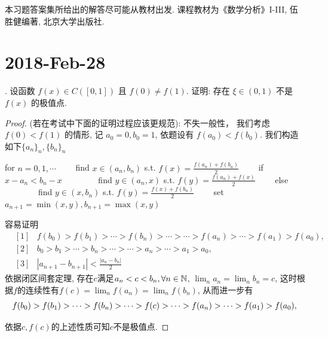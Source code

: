 \documentclass[a4paper,12pt]{article}
\author{龙子超}
\title{{\heiti {\zihao{3} 数学分析II-习题课}}}
\date{}
\begin{document}
\maketitle
%


本习题答案集所给出的解答尽可能从教材出发. 课程教材为《数学分析》I-III, 伍胜健编著,
北京大学出版社.
\section*{2018-Feb-28}
. 设函数 $f(x)\in C([0,1])$ 且 $f(0)\neq f(1)$. 
证明: 存在 $\xi\in(0,1)$ 不是 $f(x)$ 的极值点.
  \begin{proof}
(若在考试中下面的证明过程应该更规范): 不失一般性，
我们考虑 $f(0)<f(1)$ 的情形, 记 $a_0=0,b_0=1$, 依题设有 $f(a_0)<f(b_0)$. 
我们构造如下$\{a_n\}_n,\{b_n\}_n$
\begin{algorithm}
  \begin{algorithmic}
    \State for $n=0,1,\cdots$
    \State \ \ \ \ find $x\in(a_n,b_n)$ s.t. $f(x)=\frac{f(a_n)+f(b_n)}{2}$
    \State \ \ \ \ if $x-a_n<b_n-x$
    \State \ \ \ \ \ \ \ \ find $y\in(a_n,x)$ s.t. $f(y)=\frac{f(a_n)+f(x)}{2}$
    \State \ \ \ \ else 
    \State \ \ \ \ \ \ \ \ find $y\in(x,b_n)$ s.t. $f(y)=\frac{f(x)+f(b_n)}{2}$
    \State \ \ \ \ set $a_{n+1}=\min(x,y),b_{n+1}=\max(x,y)$
  \end{algorithmic}
\end{algorithm}

容易证明
\begin{eqnarray*}
  &[1]&f(b_0)>f(b_1)>\cdots>f(b_n)>\cdots>\cdots>f(a_n)>\cdots>f(a_1)>f(a_0),\\
  &[2]&b_0>b_1>\cdots>b_n>\cdots>\cdots>a_n>\cdots>a_1>a_0,\\
  &[3]&|a_{n+1}-b_{n+1}|<\frac{|a_n-b_n|}{2}
\end{eqnarray*}
依据闭区间套定理, 存在$c$满足$a_n<c<b_n,\forall n\in \mathbb{N}$, $\lim_n a_n=\lim_n b_n=c$, 
这时根据$f$的连续性有$f(c)=\lim_n f(a_n)=\lim_nf(b_n)$, 从而进一步有
\[
  f(b_0)>f(b_1)>\cdots>f(b_n)>\cdots>f(c)>\cdots>f(a_n)>\cdots>f(a_1)>f(a_0),\\
\]

依据$c,f(c)$的上述性质可知$c$不是极值点.
  \end{proof}
\end{document}
